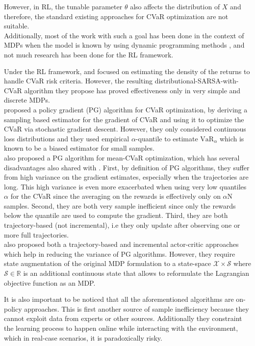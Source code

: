 However, in RL, the tunable parameter $\theta$ also affects the 
distribution of $X$ and therefore, the standard existing approaches for CVaR optimization 
are not suitable.\\
Additionally, most of the work with such a goal has been done in the context of MDPs when
the model is known  by using dynamic programming methods \citep{Chow2015, Petrik2012},
and not much research has been done for the RL framework.

Under the RL framework, \citet{Morimura2010a} and \citet{Morimura2010b}
focused on estimating the density of the returns
to handle CVaR risk criteria. However, the resulting distributional-SARSA-with-CVaR algorithm
they propose has  proved  effectiveness  only  in  very  simple  and discrete MDPs.\\
\citet{Tamar2015a} proposed a policy gradient (PG) algorithm for CVaR optimization, by
deriving a sampling based estimator for the gradient of CVaR and using it to optimize the
CVaR via stochastic gradient descent. However, they only considered continuous loss distributions
and they used empirical $\alpha$-quantile to estimate 
$\text{VaR}_\alpha$ which is known to be a biased estimator for small samples.\\
\citet{Chow2014} also proposed a PG algorithm for mean-CVaR optimization, which has several
disadvantages also shared with \citet{Tamar2015}. First, by definition of PG algorithms,
they suffer from high variance on the gradient estimates, especially when the trajectories
are long. This high variance is even more exacerbated when using very low quantiles $\alpha$ for the CVaR 
since the averaging on the rewards is effectively only on $\alpha$N samples.
Second, they are both very sample inefficient since only the rewards below the quantile
are used to compute the gradient. Third, they are both trajectory-based (not incremental), 
i.e they only update after observing one or more full trajectories.\\
\citet{Chow2014} also proposed both a trajectory-based and incremental actor-critic
approaches which help in reducing the variance of PG algorithms. However, they require
state augmentation of the original MDP formulation to a state-space
$\mathcal{X} \times \mathcal{S}$ where $\mathcal{S} \in \mathbb R$ is an additional continuous
state that allows to reformulate the Lagrangian objective function as an MDP.

It is also important to be noticed that all the aforementioned algorithms are on-policy approaches.
This is first another source of sample inefficiency
because they cannot exploit data from experts or other sources. Additionally they
constraint the learning process to happen online while interacting with the environment,
which in real-case scenarios, it is paradoxically risky.

